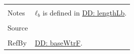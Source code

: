 \documentclass[12pt]{article}
\begin{document}
\begin{minipage}{\textwidth}
\begin{tabular}{p{} p{}}
                                                  \\ \midrule \\
                                                  Notes & ${ℓ_{b}}$ is defined in \hyperref[DD:lengthLb]{DD: lengthLb}.
                                                          \\ \midrule \\
                                                          Source & \cite{fredlund1977}
                                                                   \\ \midrule \\
                                                                   RefBy & \hyperref[DD:baseWtrF]{DD: baseWtrF}.
\\ \bottomrule \end{tabular}
\end{minipage}
\par~
\end{document}
